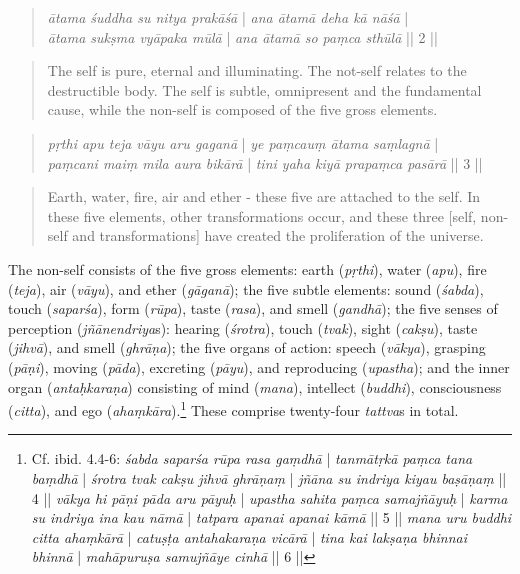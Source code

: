 \begin{quote}
\textit{ātama śuddha su nitya prakāśā} | \textit{ana ātamā deha kā nāśā} |\\
\textit{ātama sukṣma vyāpaka mūlā} | \textit{ana ātamā so paṃca sthūlā} || 2 || 
\end{quote}
\begin{quote}
The self is pure, eternal and illuminating. The not-self relates to the destructible body. The self is subtle, omnipresent and the fundamental cause, while the non-self is composed of the five gross elements.
\end{quote}
\begin{quote}
\textit{pṛthi apu teja vāyu aru gaganā} | \textit{ye paṃcauṃ ātama saṃlagnā} |\\
\textit{paṃcani maiṃ mila aura bikārā} | \textit{tini yaha kiyā prapaṃca pasārā} || 3 ||
\end{quote}
\begin{quote}
Earth, water, fire, air and ether - these five are attached to the self. In these five elements, other transformations occur, and these three [self, non-self and transformations] have created the proliferation of the universe.
\end{quote}

The non-self consists of the five gross elements: earth (\textit{pṛthi}), water (\textit{apu}), fire (\textit{teja}), air (\textit{vāyu}), and ether (\textit{gāganā}); the five subtle elements: sound (\textit{śabda}), touch (\textit{saparśa}), form (\textit{rūpa}), taste (\textit{rasa}), and smell (\textit{gandhā}); the five senses of perception (\textit{jñānendriya}s): hearing (\textit{śrotra}), touch (\textit{tvak}), sight (\textit{cakṣu}), taste (\textit{jihvā}), and smell (\textit{ghrāṇa}); the five organs of action: speech (\textit{vākya}), grasping (\textit{pāṇi}), moving (\textit{pāda}), excreting (\textit{pāyu}), and reproducing (\textit{upastha}); and the inner organ (\textit{antaḥkaraṇa}) consisting of mind (\textit{mana}), intellect (\textit{buddhi}), consciousness (\textit{citta}), and ego (\textit{ahaṃkāra}).\footnote{Cf. ibid. 4.4-6: \textit{śabda saparśa rūpa rasa gaṃdhā} | \textit{tanmātṛkā paṃca tana baṃdhā} | \textit{śrotra tvak cakṣu jihvā ghrāṇaṃ} | \textit{jñāna su indriya kiyau baṣāṇaṃ} || 4 || \textit{vākya hi pāṇi pāda aru pāyuḥ} | \textit{upastha sahita paṃca samajñāyuḥ} | \textit{karma su indriya ina kau nāmā} | \textit{tatpara apanai apanai kāmā} || 5 || \textit{mana uru buddhi citta ahaṃkārā} | \textit{catuṣṭa antahakaraṇa vicārā} | \textit{tina kai lakṣaṇa bhinnai bhinnā} | \textit{mahāpuruṣa samujñāye cinhā} || 6 ||} These comprise twenty-four \textit{tattva}s in total.

